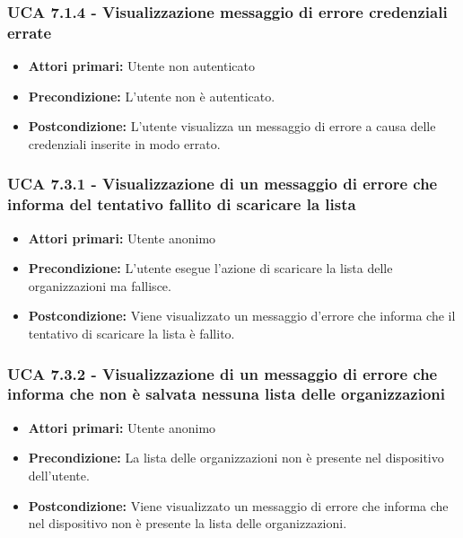 \subsubsection{UCA 7.1.4 - Visualizzazione messaggio di errore credenziali errate}%
\begin{itemize}
    \item \textbf{Attori primari:} Utente non autenticato
    \item \textbf{Precondizione:}  L'utente non è autenticato.
    \item \textbf{Postcondizione:} L'utente visualizza un messaggio di errore a causa delle credenziali inserite in modo errato.
\end{itemize}

\subsubsection{UCA 7.3.1 - Visualizzazione di un messaggio di errore che informa del tentativo fallito di scaricare la lista}%
\begin{itemize}
\item \textbf{Attori primari:} Utente anonimo
\item \textbf{Precondizione:} L'utente esegue l'azione di scaricare la lista delle organizzazioni ma fallisce.
\item \textbf{Postcondizione:} Viene visualizzato un messaggio d'errore che informa che il tentativo di scaricare la lista è fallito.

\end{itemize}

\subsubsection{UCA 7.3.2 - Visualizzazione di un messaggio di errore che informa che non è salvata nessuna lista delle organizzazioni}%
\begin{itemize}
	\item \textbf{Attori primari:} Utente anonimo
	\item \textbf{Precondizione:} La lista delle organizzazioni non è presente nel dispositivo dell'utente.
	\item \textbf{Postcondizione:} Viene visualizzato un messaggio di errore che informa che nel dispositivo non è presente la lista delle organizzazioni.
\end{itemize}

